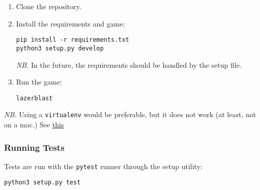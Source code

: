 \begin{enumerate}
\def\labelenumi{\arabic{enumi}.}
\item
  Clone the repository.
\item
  Install the requirements and game:

\begin{verbatim}
pip install -r requirements.txt
python3 setup.py develop
\end{verbatim}

  \emph{NB.} In the future, the requirements should be handled by the
  setup file.
\item
  Run the game:

\begin{verbatim}
lazerblast
\end{verbatim}
\end{enumerate}

\emph{NB.} Using a \texttt{virtualenv} would be preferable, but it does
not work (at least, not on a mac.) See
\href{https://bitbucket.org/pygame/pygame/issues/203/window-does-not-get-focus-on-os-x-with}{this}

\subsubsection*{Running Tests}\label{running-tests}

Tests are run with the \texttt{pytest} runner through the setup utility:

\begin{verbatim}
python3 setup.py test
\end{verbatim}
